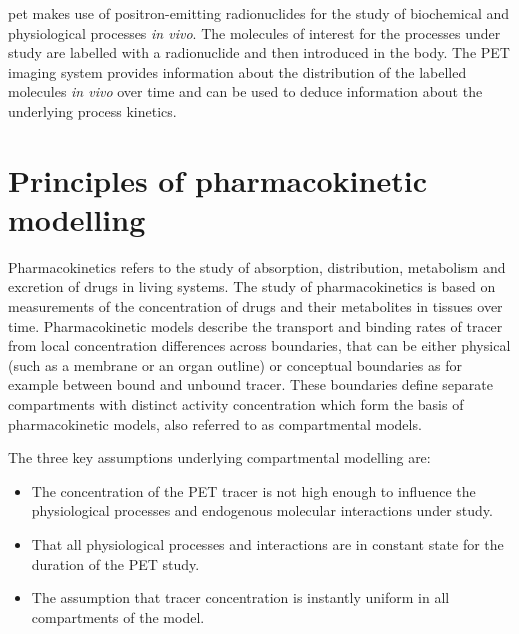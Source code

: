 \Gls{pet} makes use of positron-emitting radionuclides for the study of biochemical and physiological processes \textit{in vivo}. The molecules of interest for the processes under study are labelled with a radionuclide and then introduced in the body. The PET imaging system provides information about the distribution of the labelled molecules \textit{in vivo} over time and can be used to deduce information about the underlying process kinetics. 

\section{Principles of pharmacokinetic modelling}
Pharmacokinetics refers to the study of absorption, distribution, metabolism and excretion of drugs in living systems. The study of pharmacokinetics is based on measurements of the concentration of drugs and their metabolites in tissues over time. Pharmacokinetic models describe the transport and binding rates of tracer from local concentration differences across boundaries, that can be either physical (such as a membrane or an organ outline) or conceptual boundaries as for example between bound and unbound tracer. These boundaries define separate compartments with distinct activity concentration which form the basis of pharmacokinetic models, also referred to as compartmental models.

The three key assumptions underlying compartmental modelling are:
\begin{itemize}
\item The concentration of the PET tracer is not high enough to influence the physiological processes and endogenous molecular interactions under study.
\item That all physiological processes and interactions are in constant state for the duration of the PET study.
\item The assumption that tracer concentration is instantly uniform in all compartments of the model.
\end{itemize}

